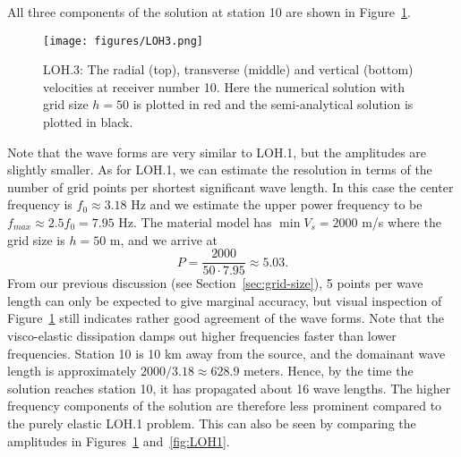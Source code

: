 \documentclass[11pt]{report}
\begin{document}
All three components of the solution at station 10 are shown in Figure~\ref{fig:LOH3}.
\begin{figure}[ht]
  \begin{center}
    \texttt{[image: figures/LOH3.png]}
    \caption{LOH.3: The radial (top), transverse (middle) and vertical (bottom) velocities at
      receiver number 10. Here the numerical solution with grid size $h=50$ is plotted in red and
      the semi-analytical solution is plotted in black.}
    \label{fig:LOH3}
  \end{center}
\end{figure}
Note that the wave forms are very similar to LOH.1, but the amplitudes are slightly smaller.
As for LOH.1, we can estimate the resolution in terms of the number of grid points per shortest
significant wave length. In this case the center frequency is $f_0\approx 3.18$ Hz and we estimate
the upper power frequency to be $f_{max}\approx 2.5 f_0 = 7.95$ Hz. The material model has $\min V_s
= 2000$ m/s where the grid size is $h=50$ m, and we arrive at
\[
P = \dfrac{2000}{50\cdot 7.95} \approx 5.03.
\]
From our previous discussion (see Section~\ref{sec:grid-size}), 5 points per wave length can only be
expected to give marginal accuracy, but visual inspection of Figure~\ref{fig:LOH3} still indicates
rather good agreement of the wave forms. Note that the visco-elastic dissipation damps out higher
frequencies faster than lower frequencies. Station 10 is 10 km away from the source, and the
domainant wave length is approximately $2000/3.18 \approx 628.9$ meters. Hence, by the time the
solution reaches station 10, it has propagated about 16 wave lengths. The higher frequency
components of the solution are therefore less prominent compared to the purely elastic LOH.1
problem. This can also be seen by comparing the amplitudes in Figures~\ref{fig:LOH3}
and~\ref{fig:LOH1}.





\end{document}
